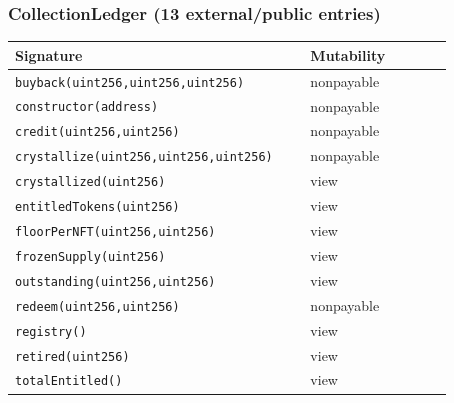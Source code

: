 \subsubsection*{CollectionLedger \;\normalfont\small(13 external/public entries)}
\begin{longtable}{@{}p{0.62\linewidth}p{0.30\linewidth}@{}}
\toprule \textbf{Signature} & \textbf{Mutability} \\ \midrule \endhead
\texttt{\scriptsize buyback(uint256,uint256,uint256)} & nonpayable \\
\texttt{\scriptsize constructor(address)} & nonpayable \\
\texttt{\scriptsize credit(uint256,uint256)} & nonpayable \\
\texttt{\scriptsize crystallize(uint256,uint256,uint256)} & nonpayable \\
\texttt{\scriptsize crystallized(uint256)} & view \\
\texttt{\scriptsize entitledTokens(uint256)} & view \\
\texttt{\scriptsize floorPerNFT(uint256,uint256)} & view \\
\texttt{\scriptsize frozenSupply(uint256)} & view \\
\texttt{\scriptsize outstanding(uint256,uint256)} & view \\
\texttt{\scriptsize redeem(uint256,uint256)} & nonpayable \\
\texttt{\scriptsize registry()} & view \\
\texttt{\scriptsize retired(uint256)} & view \\
\texttt{\scriptsize totalEntitled()} & view \\
\bottomrule\end{longtable}

